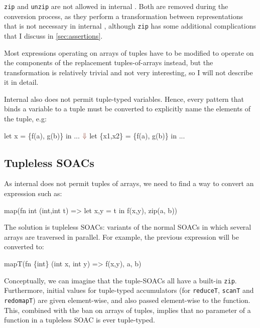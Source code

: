 \texttt{zip} and \texttt{unzip} are not allowed in internal \LO{}.
Both are removed during the conversion process, as they perform a
transformation between representations that is not necessary in
internal \LO{}, although \texttt{zip} has some additional
complications that I discuss in \cref{sec:assertions}.

Most expressions operating on arrays of tuples have to be modified to
operate on the components of the replacement tuples-of-arrays instead,
but the transformation is relatively trivial and not very interesting,
so I will not describe it in detail.

Internal \LO{} also does not permit tuple-typed variables.  Hence,
every pattern that binds a variable to a tuple must be converted to
explicitly name the elements of the tuple, e.g:

\begin{colorcode}
let x = \{f(a), g(b)\} in
...
  \(\emp{\Downarrow}\)
let \{x1,x2\} = \{f(a), g(b)\} in
...
\end{colorcode}

\subsection{Tupleless SOACs}

As internal \LO{} does not permit tuples of arrays, we need to find a
way to convert an expression such as:
\begin{colorcode}
map(fn int ({int,int} t) =>
      let {x,y} = t in
      f(x,y),
    zip(a, b))
\end{colorcode}
The solution is tupleless SOACs: variants of the normal SOACs in which
several arrays are traversed in parallel.  For example, the previous
expression will be converted to:
\begin{colorcode}
mapT(fn \{int\} (int x, int y) =>
       f(x,y),
     a, b)
\end{colorcode}
Conceptually, we can imagine that the tuple-SOACs all have a built-in
\texttt{zip}.  Furthermore, initial values for tuple-typed
accumulators (for \texttt{reduceT}, \texttt{scanT} and
\texttt{redomapT}) are given element-wise, and also passed
element-wise to the function.  This, combined with the ban on arrays
of tuples, implies that no parameter of a function in a tupleless SOAC
is ever tuple-typed.

